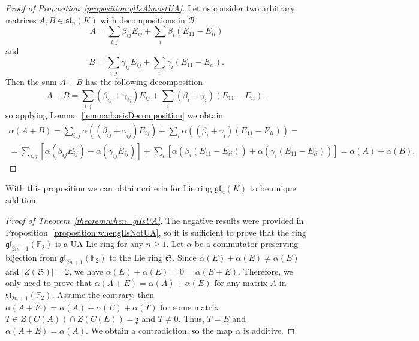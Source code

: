 \documentclass[a4paper,reqno,12pt]{amsart}
\theoremstyle{definition}
\theoremstyle{remark}
\def\FF{{\mathbb F}}
\def\SSS{\mathfrak{S}}
\def\zzz{\mathfrak{z}}
\def\gl{\mathfrak{gl}}
\def\sl{\mathfrak{sl}}
\renewcommand{\ge}{\geqslant}
\begin{document}
	\begin{proof}[Proof of Proposition~\ref{proposition:glIsAlmostUA}]
		Let us consider two arbitrary matrices $A, B \in \sl_n(K)$ with decompositions in $\mathcal{B}$
		\begin{equation*}
			A = \sum_{i, j} \beta_{ij} E_{ij} + \sum_{i} \beta_{i} (E_{11} - E_{ii})
		\end{equation*}
		and
		\begin{equation*}
			B = \sum_{i, j} \gamma_{ij} E_{ij} + \sum_{i} \gamma_{i} (E_{11} - E_{ii}).
		\end{equation*}
		Then the sum $A + B$ has the following decomposition
		\begin{equation*}
			A + B = \sum_{i, j} (\beta_{ij} + \gamma_{ij}) E_{ij} + \sum_{i} (\beta_{i} + \gamma_{i}) (E_{11} - E_{ii}),
		\end{equation*}
		so applying Lemma~\ref{lemma:basisDecomposition} we obtain
		\begin{multline*}
			\alpha(A + B) = \sum_{i, j} \alpha((\beta_{ij} + \gamma_{ij}) E_{ij}) + \sum_{i} \alpha((\beta_{i} + \gamma_{i}) (E_{11} - E_{ii})) = \\ = \sum_{i, j} \left[ \alpha(\beta_{ij} E_{ij}) + \alpha(\gamma_{ij} E_{ij}) \right] + \sum_{i} \left[ \alpha(\beta_{i}(E_{11} - E_{ii})) + \alpha(\gamma_i (E_{11} - E_{ii})) \right] = \alpha(A) + \alpha(B).
		\end{multline*}
	\end{proof}

	With this proposition we can obtain criteria for Lie ring $\gl_n(K)$ to be unique addition.

	\begin{proof}[Proof of Theorem~\ref{theorem:when_glIsUA}]
		The negative results were provided in Proposition~\ref{proposition:whenglIsNotUA}, so it is sufficient to prove that the ring $\gl_{2n + 1}(\FF_2)$ is a UA-Lie ring for any $n \ge 1$. Let $\alpha$ be a commutator-preserving bijection from $\gl_{2n + 1}(\FF_2)$ to the Lie ring $\SSS$. Since $\alpha(E) + \alpha(E) \neq \alpha(E)$ and $|Z(\SSS)| = 2$, we have $\alpha(E) + \alpha(E) = 0 = \alpha(E + E)$. Therefore, we only need to prove that $\alpha(A + E) = \alpha(A) + \alpha(E)$ for any matrix $A$ in $\sl_{2n + 1}(\FF_2)$. Assume the contrary, then $\alpha(A + E) = \alpha(A) + \alpha(E) + \alpha(T)$ for some matrix $T \in Z(C(A)) \cap Z(C(E)) = \zzz$ and $T \neq 0$. Thus, $T = E$ and $\alpha(A + E) = \alpha(A)$. We obtain a contradiction, so the map $\alpha$ is additive.
	\end{proof}
\end{document}
